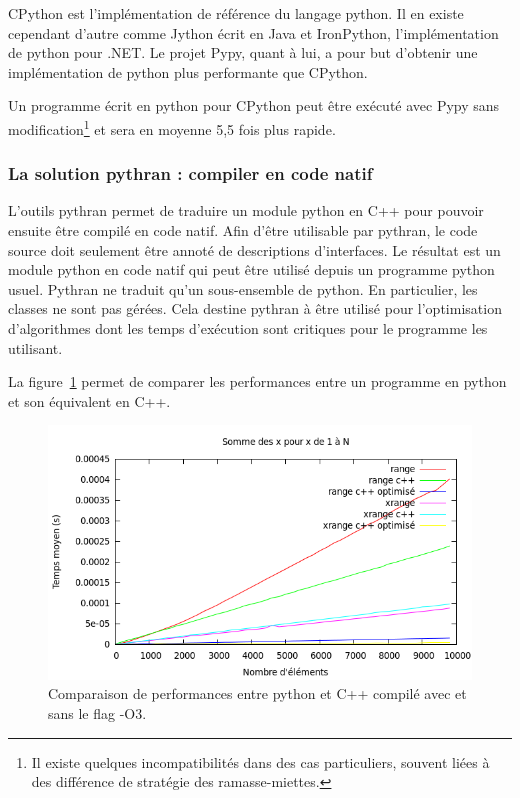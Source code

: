 \documentclass[a4paper]{article}
\begin{document}
CPython est l'implémentation de référence du langage python. Il en
existe cependant d'autre comme Jython écrit en Java et IronPython,
l'implémentation de python pour .NET. Le projet Pypy, quant à lui, a
pour but d'obtenir une implémentation de python plus performante que
CPython.

Un programme écrit en python pour CPython peut être exécuté avec Pypy
sans modification\footnote{Il existe quelques incompatibilités dans
  des cas particuliers, souvent liées à des différence de stratégie
  des ramasse-miettes\cite{PypyDiff}.} et sera en moyenne 5,5 fois
plus rapide\cite{PypySpeed}.

\subsubsection{La solution pythran : compiler en code natif}

L'outils pythran permet de traduire un module python en C++ pour
pouvoir ensuite être compilé en code natif. Afin d'être utilisable par
pythran, le code source doit seulement être annoté de descriptions
d'interfaces. Le résultat est un module python en code natif qui peut
être utilisé depuis un programme python usuel. Pythran ne traduit
qu'un sous-ensemble de python. En particulier, les classes ne sont pas
gérées. Cela destine pythran à être utilisé pour l'optimisation
d'algorithmes dont les temps d'exécution sont critiques pour le
programme les utilisant.

La figure~\ref{RangeXrangePyCpp} permet de comparer les performances
entre un programme en python et son équivalent en C++.

\begin{figure}[h]
  \includegraphics[scale=1]{./Pictures/RangeXrangePyCpp}
  \caption{Comparaison de performances entre python et C++ compilé avec et sans le flag -O3.}
  \label{RangeXrangePyCpp}
\end{figure}
\end{document}
